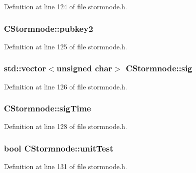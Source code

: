 Definition at line 124 of file stormnode.\+h.

\hypertarget{class_c_stormnode_a43efb713c0d8e8f01b9ea593e025856b}{}
\subsubsection[{pubkey2}]{ C\+Stormnode\+::pubkey2}\label{class_c_stormnode_a43efb713c0d8e8f01b9ea593e025856b}


Definition at line 125 of file stormnode.\+h.

\hypertarget{class_c_stormnode_a7484d9ff7d908f3610f6946aba19a7b3}{}
\subsubsection[{sig}]{\setlength{\rightskip}{0pt plus 5cm}std\+::vector$<$unsigned char$>$ C\+Stormnode\+::sig}\label{class_c_stormnode_a7484d9ff7d908f3610f6946aba19a7b3}


Definition at line 126 of file stormnode.\+h.

\hypertarget{class_c_stormnode_ae77544488795272ca9615ed1e23d3b77}{}
\subsubsection[{sig\+Time}]{ C\+Stormnode\+::sig\+Time}\label{class_c_stormnode_ae77544488795272ca9615ed1e23d3b77}


Definition at line 128 of file stormnode.\+h.

\hypertarget{class_c_stormnode_a7e879cd7e4f39560cc846c5127a58afa}{}
\subsubsection[{unit\+Test}]{\setlength{\rightskip}{0pt plus 5cm}bool C\+Stormnode\+::unit\+Test}\label{class_c_stormnode_a7e879cd7e4f39560cc846c5127a58afa}


Definition at line 131 of file stormnode.\+h.

